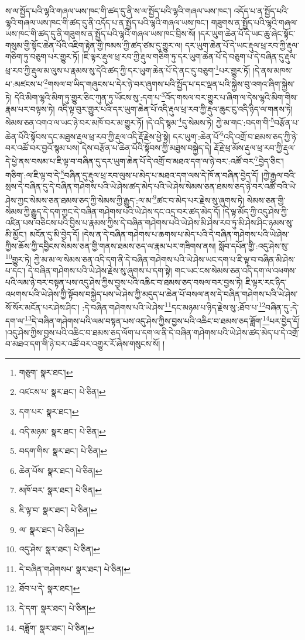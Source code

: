 ས་ལ་སྤྱོད་པའི་ལྷའི་གཞལ་ཡས་ཁང་གི་ཚད་དུ་ནི་ས་ལ་སྤྱོད་པའི་ལྷའི་གཞལ་ཡས་ཁང་། འདོད་པ་ན་སྤྱོད་པའི་ལྷའི་གཞལ་ཡས་ཁང་གི་ཚད་དུ་ནི་འདོད་པ་ན་སྤྱོད་པའི་ལྷའི་གཞལ་ཡས་ཁང་། གཟུགས་ན་སྤྱོད་པའི་ལྷའི་གཞལ་ཡས་ཁང་གི་ཚད་དུ་ནི་གཟུགས་ན་སྤྱོད་པའི་ལྷའི་གཞལ་ཡས་ཁང་བྲིས་སོ། །དར་ཡུག་ཆེན་པོ་དེ་ཡང་ཆུ་ཞེང་སྟོང་གསུམ་གྱི་སྟོང་ཆེན་པོའི་འཇིག་རྟེན་གྱི་ཁམས་ཀྱི་ཚད་ཙམ་དུ་གྱུར་ལ། དར་ཡུག་ཆེན་པོ་དེ་ཡང་རྡུལ་ཕྲ་རབ་ཀྱི་རྡུལ་གཅིག་ཏུ་བཅུག་པར་གྱུར་ཏོ། །ཇི་ལྟར་རྡུལ་ཕྲ་རབ་ཀྱི་རྡུལ་གཅིག་ཏུ་དར་ཡུག་ཆེན་པོ་དེ་བཅུག་པ་དེ་བཞིན་དུ་རྡུལ་ཕྲ་རབ་ཀྱི་རྡུལ་མ་ལུས་པ་རྣམས་སུ་དེའི་ཚད་ཀྱི་དར་ཡུག་ཆེན་པོ་དེ་ནང་དུ་བཅུག་\footnote{གཅུག་  སྣར་ཐང་། }པར་གྱུར་ཏོ། །དེ་ནས་མཁས་པ་:མཛངས་པ་\footnote{འཛངས་པ་  སྣར་ཐང་།  པེ་ཅིན། }གསལ་བ་ཡིད་གཞུངས་པ་དེར་ཉེ་བར་ཞུགས་པའི་སྤྱོད་པ་དང་ལྡན་པའི་སྐྱེས་བུ་འགའ་ཞིག་སྐྱེས་ཏེ། དེའི་མིག་ལྷའི་མིག་ཏུ་གྱུར་ཅིང་ཀུན་ཏུ་ཡོངས་སུ་:དག་པ་\footnote{དག་པར་  སྣར་ཐང་། }འོད་གསལ་བར་གྱུར་པ་ཞིག་ལ་དེས་ལྷའི་མིག་གིས་རྣམ་པར་བལྟས་ཏེ། འདི་ལྟ་བུར་གྱུར་པའི་དར་ཡུག་ཆེན་པོ་འདི་རྡུལ་ཕྲ་རབ་ཀྱི་རྡུལ་ཆུང་ངུ་འདི་ཉིད་ལ་གནས་ཏེ། སེམས་ཅན་འགའ་ལ་ཡང་ཉེ་བར་མཁོ་བར་མ་གྱུར་ཏོ། །དེ་འདི་སྙམ་\footnote{འདི་མཉམ་  སྣར་ཐང་།  པེ་ཅིན། }དུ་སེམས་ཏེ། ཀྱེ་མ་གང་:བདག་གི་\footnote{བདག་གིས་  སྣར་ཐང་།  པེ་ཅིན། }བརྩོན་པ་ཆེན་པོའི་སྟོབས་དང་མཐུས་རྡུལ་ཕྲ་རབ་ཀྱི་རྡུལ་འདི་རྡོ་རྗེས་ཕྱེ་སྟེ། དར་ཡུག་:ཆེན་པོ་\footnote{ཆེན་པོས་  སྣར་ཐང་།  པེ་ཅིན། }འདི་འགྲོ་བ་ཐམས་ཅད་ཀྱི་ཉེ་བར་འཚོ་བར་བྱའོ་སྙམ་པས། དེས་བརྩོན་པ་ཆེན་པོའི་སྟོབས་ཀྱི་མཐུས་བསྐྱེད་དེ། རྡོ་རྗེ་ཕྲ་མོས་རྡུལ་ཕྲ་རབ་ཀྱི་རྡུལ་དེ་ཕྱེ་ནས་བསམ་པ་ཇི་ལྟ་བ་བཞིན་དུ་དར་ཡུག་ཆེན་པོ་དེ་འགྲོ་བ་མཐའ་དག་ལ་ཉེ་བར་:འཚོ་བར་\footnote{མཁོ་བར་  སྣར་ཐང་།  པེ་ཅིན། }བྱེད་ཅིང་། གཅིག་:ལ་ཇི་ལྟ་བ་དེ་\footnote{ཇི་ལྟ་བ་  སྣར་ཐང་།  པེ་ཅིན། }བཞིན་དུ་རྡུལ་ཕྲ་རབ་ལུས་པ་མེད་པ་མཐའ་དག་ལས་དེ་ཁོ་ན་བཞིན་བྱེད་དོ། །ཀྱེ་རྒྱལ་བའི་སྲས་དེ་བཞིན་དུ་དེ་བཞིན་གཤེགས་པའི་ཡེ་ཤེས་ཚད་མེད་པའི་ཡེ་ཤེས་སེམས་ཅན་ཐམས་ཅད་ཉེ་བར་འཚོ་བའི་ཡེ་ཤེས་ཀྱང་སེམས་ཅན་ཐམས་ཅད་ཀྱི་སེམས་ཀྱི་རྒྱུད་:ལ་མ་\footnote{ལ་  སྣར་ཐང་།  པེ་ཅིན། }ཚང་བ་མེད་པར་རྗེས་སུ་ཞུགས་ཏེ། སེམས་ཅན་གྱི་སེམས་ཀྱི་རྒྱུད་དེ་དག་ཀྱང་དེ་བཞིན་གཤེགས་པའི་ཡེ་ཤེས་དང་འདྲ་བར་ཚད་མེད་དོ། །དེ་ལྟ་མོད་ཀྱི་འདུ་ཤེས་ཀྱི་འཛིན་པས་བཅིངས་པའི་བྱིས་པ་རྣམས་ཀྱིས་དེ་བཞིན་གཤེགས་པའི་ཡེ་ཤེས་མི་ཤེས་རབ་ཏུ་མི་ཤེས་ཤིང་ཉམས་སུ་མི་མྱོང་། མངོན་དུ་མི་བྱེད་དོ། །དེས་ན་དེ་བཞིན་གཤེགས་པ་ཆགས་པ་མེད་པའི་དེ་བཞིན་གཤེགས་པའི་ཡེ་ཤེས་ཀྱིས་ཆོས་ཀྱི་དབྱིངས་སེམས་ཅན་གྱི་གནས་ཐམས་ཅད་ལ་རྣམ་པར་གཟིགས་ནས། སློབ་དཔོན་གྱི་:འདུ་ཤེས་སུ་\footnote{འདུ་ཤེས་  སྣར་ཐང་།  པེ་ཅིན། }གྱུར་ཏེ། ཀྱེ་མ་མ་ལ་སེམས་ཅན་འདི་དག་ནི་དེ་བཞིན་གཤེགས་པའི་ཡེ་ཤེས་ཡང་དག་པ་ཇི་ལྟ་བ་བཞིན་མི་ཤེས་པ་དང་། དེ་བཞིན་གཤེགས་པའི་ཡེ་ཤེས་རྗེས་སུ་ཞུགས་པ་དག་སྟེ། གང་ཡང་ངས་སེམས་ཅན་འདི་དག་ལ་འཕགས་པའི་ལམ་ཉེ་བར་བསྟན་པས་འདུ་ཤེས་ཀྱིས་བྱས་པའི་འཆིང་བ་ཐམས་ཅད་བསལ་བར་བྱས་ཏེ། ཇི་ལྟར་རང་ཉིད་འཕགས་པའི་ཡེ་ཤེས་ཀྱི་སྟོབས་བསྐྱེད་པས་ཡེ་ཤེས་ཀྱི་མདུད་པ་ཆེན་པོ་བསལ་ནས་དེ་བཞིན་གཤེགས་པའི་ཡེ་ཤེས་སོ་སོར་མངོན་པར་ཤེས་ཤིང་། :དེ་བཞིན་གཤེགས་པའི་ཡེ་ཤེས་\footnote{དེ་བཞིན་གཤེགསཔ་  སྣར་ཐང་།  པེ་ཅིན། }དང་མཉམ་པ་ཉིད་རྗེས་སུ་:ཐོབ་པ་\footnote{ཐོབ་པ་དེ་  སྣར་ཐང་། }བཞིན་དུ་:དེ་དག་ལ་\footnote{དེ་དག་  སྣར་ཐང་།  པེ་ཅིན། }དེ་བཞིན་གཤེགས་པའི་ལམ་བསྟན་པས་འདུ་ཤེས་ཀྱིས་བྱས་པའི་འཆིང་བ་ཐམས་ཅད་ཟློག་\footnote{བཟློག་  སྣར་ཐང་།  པེ་ཅིན། }པར་བྱེད་དོ། །འདུ་ཤེས་ཀྱིས་བྱས་པའི་འཆིང་བ་ཐམས་ཅད་ལོག་པ་དག་ལ་ནི་དེ་བཞིན་གཤེགས་པའི་ཡེ་ཤེས་ཚད་མེད་པ་དེ་འགྲོ་བ་མཐའ་དག་གི་ཉེ་བར་འཚོ་བར་འགྱུར་རོ་ཞེས་གསུངས་སོ། །
